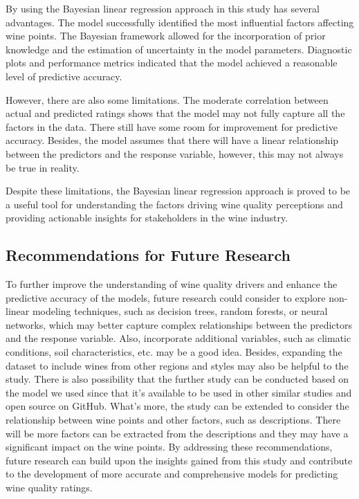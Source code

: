 \documentclass{article}
\begin{document}
By using the Bayesian linear regression approach in this study has several advantages. The model successfully identified the most influential factors affecting wine points. The Bayesian framework allowed for the incorporation of prior knowledge and the estimation of uncertainty in the model parameters. Diagnostic plots and performance metrics indicated that the model achieved a reasonable level of predictive accuracy.

However, there are also some limitations. The moderate correlation between actual and predicted ratings shows that the model may not fully capture all the factors in the data. There still have some room for improvement for predictive accuracy. Besides, the model assumes that there will have a linear relationship between the predictors and the response variable, however, this may not always be true in reality. 

Despite these limitations, the Bayesian linear regression approach is proved to be a useful tool for understanding the factors driving wine quality perceptions and providing actionable insights for stakeholders in the wine industry.

\subsection{Recommendations for Future Research}

To further improve the understanding of wine quality drivers and enhance the predictive accuracy of the models, future research could consider to explore non-linear modeling techniques, such as decision trees, random forests, or neural networks, which may better capture complex relationships between the predictors and the response variable. Also, incorporate additional variables, such as climatic conditions, soil characteristics, etc. may be a good idea. Besides, expanding the dataset to include wines from other regions and styles may also be helpful to the study. There is also possibility that the further study can be conducted based on the model we used since that it's available to be used in other similar studies and open source on GitHub. What's more, the study can be extended to consider the relationship between wine points and other factors, such as descriptions. There will be more factors can be extracted from the descriptions and they may have a significant impact on the wine points. By addressing these recommendations, future research can build upon the insights gained from this study and contribute to the development of more accurate and comprehensive models for predicting wine quality ratings.



\appendix
\end{document}
